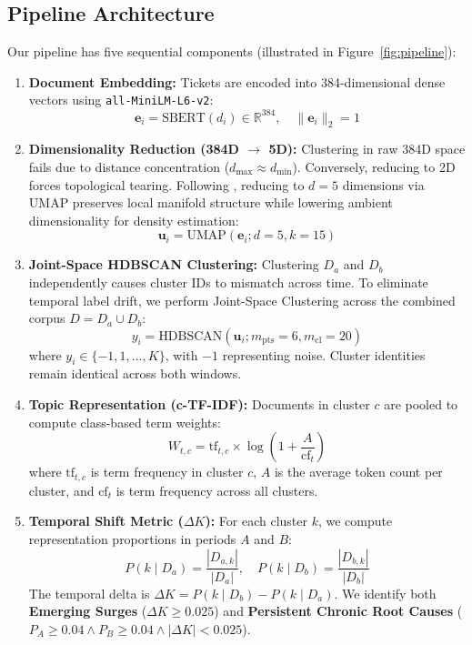 \documentclass[11pt]{article}
\begin{document}
\subsection{Pipeline Architecture}
Our pipeline has five sequential components (illustrated in Figure~\ref{fig:pipeline}):
\begin{enumerate}
    \item \textbf{Document Embedding:} Tickets are encoded into 384-dimensional dense vectors using \texttt{all-MiniLM-L6-v2}:
    \begin{equation}
        \mathbf{e}_i = \text{SBERT}(d_i) \in \mathbb{R}^{384}, \quad \|\mathbf{e}_i\|_2 = 1
    \end{equation}
    \item \textbf{Dimensionality Reduction (384D $\rightarrow$ 5D):} Clustering in raw 384D space fails due to distance concentration ($d_{\max} \approx d_{\min}$). Conversely, reducing to 2D forces topological tearing. Following \citet{grootendorst2022bertopic}, reducing to $d = 5$ dimensions via UMAP preserves local manifold structure while lowering ambient dimensionality for density estimation:
    \begin{equation}
        \mathbf{u}_i = \text{UMAP}(\mathbf{e}_i; d = 5, k = 15)
    \end{equation}
    \item \textbf{Joint-Space HDBSCAN Clustering:} Clustering $D_a$ and $D_b$ independently causes cluster IDs to mismatch across time. To eliminate temporal label drift, we perform Joint-Space Clustering across the combined corpus $D = D_a \cup D_b$:
    \begin{equation}
        y_i = \text{HDBSCAN}(\mathbf{u}_i; m_{\text{pts}} = 6, m_{\text{cl}} = 20)
    \end{equation}
    where $y_i \in \{-1, 1, \dots, K\}$, with $-1$ representing noise. Cluster identities remain identical across both windows.
    \item \textbf{Topic Representation (c-TF-IDF):} Documents in cluster $c$ are pooled to compute class-based term weights:
    \begin{equation}
        W_{t,c} = \text{tf}_{t,c} \times \log\left( 1 + \frac{A}{\text{cf}_t} \right)
    \end{equation}
    where $\text{tf}_{t,c}$ is term frequency in cluster $c$, $A$ is the average token count per cluster, and $\text{cf}_t$ is term frequency across all clusters.
    \item \textbf{Temporal Shift Metric ($\Delta K$):} For each cluster $k$, we compute representation proportions in periods $A$ and $B$:
    \begin{equation}
        P(k \mid D_a) = \frac{|D_{a,k}|}{|D_a|}, \quad P(k \mid D_b) = \frac{|D_{b,k}|}{|D_b|}
    \end{equation}
    The temporal delta is $\Delta K = P(k \mid D_b) - P(k \mid D_a)$. We identify both \textbf{Emerging Surges} ($\Delta K \ge 0.025$) and \textbf{Persistent Chronic Root Causes} ($P_A \ge 0.04 \land P_B \ge 0.04 \land |\Delta K| < 0.025$).
\end{enumerate}
\end{document}
